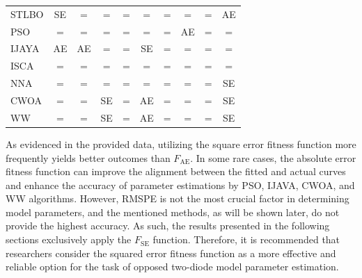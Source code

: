 \documentclass[a4paper,fleqn]{cas-sc}
\begin{document}
\begin{table}[<options>]
\begin{tabular*}{\tblwidth}{@{}LCCCCCCCCC@{}}
STLBO &SE &=  &=  &=  &=  &=  &=  &=  & AE \\
PSO &=  &=  &=  &=  &=  &=  & AE &=  &=  \\
IJAYA & AE & AE & = &=  &SE & = & = &=  &=  \\
ISCA &=  &=  &=  &=  &=  &=  &=  &=  &=  \\
NNA &=  &=  &=  &=  &=  &=  &=  &=  & SE\\
CWOA &=  &=  & SE&=  &  AE&=  &=  &=  &SE \\
WW &=  &=  & SE& = & AE & = &=  &=  & SE\\
\bottomrule
\end{tabular*}
\end{table}

As evidenced in the provided data, utilizing the square error fitness function more frequently yields better outcomes than $F_\mathrm{AE}$.
In some rare cases, the absolute error fitness function can improve the alignment
between the fitted and actual curves and
enhance the accuracy of parameter estimations by PSO, IJAVA, CWOA, and WW algorithms.
However, RMSPE is not the most crucial factor in determining model parameters, and the mentioned methods,
as will be shown later, do not provide the highest accuracy.
As such, the results presented in the following sections exclusively apply the $F_\mathrm{SE}$ function.
Therefore, it is recommended that researchers consider
the squared error fitness function as a more effective and reliable option for the task of opposed two-diode model parameter estimation.
\end{document}
